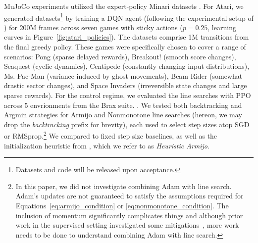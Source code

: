 \documentclass[10pt]{article} %
\begin{document}
MuJoCo experiments utilized the expert-policy Minari datasets \citep{minari}. For Atari, we generated datasets\footnote{Datasets and code will be released upon acceptance.} by training a DQN agent (following the experimental setup of \cite{castro18dopamine}) for 200M frames across seven games with sticky actions ($p=0.25$, learning curves in Figure~\ref{fig:atari_policies}). The datasets comprise 1M transitions from the final greedy policy. These games were specifically chosen to cover a range of scenarios: Pong (sparse delayed rewards), Breakout! (smooth score changes), Seaquest (cyclic dynamics), Centipede (constantly changing input distributions), Ms. Pac-Man (variance induced by ghost movements), Beam Rider (somewhat drastic sector changes), and Space Invaders (irreversible state changes and large sparse rewards).  
For the control regime, we evaluated the line searches with PPO \citep{schulman2017proximal} across 5 envrionments from the Brax suite. \citep{brax2021github}. We tested both backtracking and Argmin strategies for Armijo and Nonmonotone line searches (hereon, we may drop the \textit{backtracking} prefix for brevity), each used to select step sizes atop SGD or RMSprop.\footnote{In this paper, we did not investigate combining Adam \citep{kingma2015adam} with line search. Adam's updates are not guaranteed to satisfy the assumptions required for Equations~\ref{eq:armijo_condition} or \ref{eq:nonmonotone_condition}. The inclusion of momentum significantly complicates things and although prior work in the supervised setting investigated some mitigations~\citep{kenneweg2024improving,shea2024so,fan2023msl}, more work needs to be done to understand combining Adam with line search.}  We compared to fixed step size baselines, as well as the initialization heuristic from \cite{vaswani2019painless}, which we refer to as \textit{Heuristic Armijo}.

\end{document}
